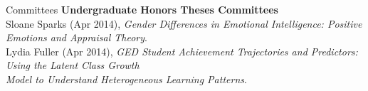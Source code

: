 \documentclass {resume}
\begin{document}
\begin{rSection}{\textrm{Committees}}
{\large \textbf{Undergraduate Honors Theses Committees}}\\
Sloane Sparks (Apr 2014), \textit{Gender Differences in Emotional Intelligence: Positive Emotions and Appraisal Theory}.%
\smallskip\\%
Lydia Fuller (Apr 2014), \textit{GED Student Achievement Trajectories and Predictors: Using the Latent Class Growth\\
\hspace* {6 mm}Model to Understand Heterogeneous Learning Patterns}.%
\end{rSection}\pagebreak
\end{document}
